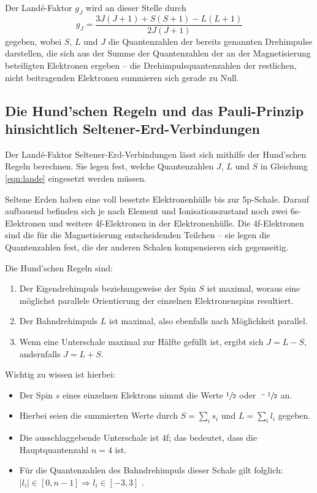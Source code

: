     Der Landé-Faktor $g_J$ wird an dieser Stelle durch 
    \begin{equation}
        g_J=\frac{3J(J+1)+S(S+1)-L(L+1)}{2J(J+1)}
        \label{eqn:lande}
    \end{equation}
    gegeben, wobei $S$, $L$ und $J$ die Quantenzahlen der bereits genannten Drehimpulse darstellen, die sich aus der Summe
    der Quantenzahlen der an der Magnetisierung beteiligten Elektronen ergeben -- die Drehimpulsquantenzahlen der restlichen, nicht beitragenden
    Elektronen summieren sich gerade zu Null. 

\subsection{Die Hund'schen Regeln und das Pauli-Prinzip hinsichtlich Seltener-Erd-Verbindungen}
\label{sub:wauwau}

    Der Landé-Faktor Seltener-Erd-Verbindungen lässt sich mithilfe der Hund'schen Regeln berechnen. 
    Sie legen fest, welche Quantenzahlen $J$, $L$ und $S$ in Gleichung \eqref{eqn:lande} eingesetzt werden müssen. 

    Seltene Erden haben eine voll besetzte Elektronenhülle bis zur 5p-Schale. Darauf aufbauend befinden sich je nach 
    Element und Ionisationszustand noch zwei 6s-Elektronen und weitere 4f-Elektronen in der Elektronenhülle. 
    Die 4f-Elektronen sind die für die Magnetisierung entscheidenden Teilchen -- sie legen die Quantenzahlen fest, 
    die der anderen Schalen kompensieren sich gegenseitig. 

    Die Hund'schen Regeln sind\cite{Versuchsanleitung}:
    \begin{enumerate}
        \item Der Eigendrehimpuls beziehungsweise der Spin $S$ ist maximal, woraus eine möglichst parallele Orientierung 
            der einzelnen Elektronenspins resultiert.    
        \item Der Bahndrehimpuls $L$ ist maximal, also ebenfalls nach Möglichkeit parallel. 
        \item Wenn eine Unterschale maximal zur Hälfte gefüllt ist, ergibt sich ${J=L-S}$, andernfalls ${J=L+S}$.
    \end{enumerate}
    Wichtig zu wissen ist hierbei: 
    \begin{itemize}
        \item Der Spin $s$ eines einzelnen Elektrons nimmt die Werte $\sfrac{1}{2}$ oder $\sfrac{-1}{2}$ an. 
        \item Hierbei seien die summierten Werte durch $S=\sum_i s_i$ und $L=\sum_i l_i$ gegeben. 
        \item Die ausschlaggebende Unterschale ist 4f; das bedeutet, dass die Hauptquantenzahl ${n=4}$ ist.
        \item Für die Quantenzahlen des Bahndrehimpuls dieser Schale gilt folglich: $|l_i| \in [0,n-1] \Rightarrow l_i \in [-3,3]$ .
    \end{itemize}


